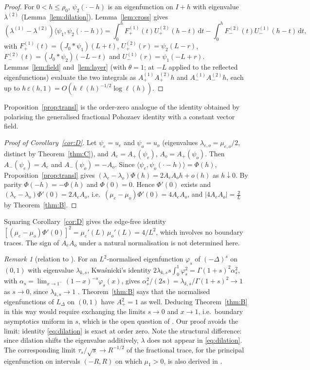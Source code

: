 \documentclass[11pt]{amsart}
\newcommand{\LD}{L_\Delta}
\newcommand{\eps}{\varepsilon}
\newcommand{\dd}{\,\mathrm{d}}
\theoremstyle{definition}
\theoremstyle{remark}
\newtheorem{remark}[theorem]{Remark}
\numberwithin{equation}{section}
\begin{document}
\begin{proof}
For $0<h\le\rho_0$, $\psi_2(\cdot-h)$ is an eigenfunction on $I+h$ with eigenvalue $\lambda^{(2)}$ (Lemma~\ref{lem:dilation}). Lemma~\ref{lem:cross} gives
\[
(\lambda^{(1)}-\lambda^{(2)})\langle\psi_1,\psi_2(\cdot-h)\rangle=\int_0^hF^{(1)}_+(t)U^{(2)}_+(h-t)\dd t-\int_0^hF^{(2)}_-(t)U^{(1)}_-(h-t)\dd t,
\]
with $F^{(1)}_+(t)=(J_0*\psi_1)(L+t)$, $U^{(2)}_+(r)=\psi_2(L-r)$, $F^{(2)}_-(t)=(J_0*\psi_2)(-L-t)$ and $U^{(1)}_-(r)=\psi_1(-L+r)$. Lemmas~\ref{lem:field} and~\ref{lem:layer} (with $\theta=1$; at $-L$ applied to the reflected eigenfunctions) evaluate the two integrals as $A_+^{(1)}A_+^{(2)}h$ and $A_-^{(1)}A_-^{(2)}h$, each up to $h\,\eps(h,1)=O(h\,\ell(h)^{-1/2}\log\ell(h))$.
\end{proof}

Proposition~\ref{prop:transl} is the order-zero analogue of the identity obtained by polarising the generalised fractional Pohozaev identity \cite[Thm.~1.2]{DFW24} with a constant vector field.

\begin{proof}[Proof of Corollary~\ref{cor:D}]
Let $\psi_e=u_e$ and $\psi_o=u_o$ (eigenvalues $\lambda_{e,o}=\mu_{e,o}/2$, distinct by Theorem~\ref{thm:C}), and $A_e=A_+(\psi_e)$, $A_o=A_+(\psi_o)$. Then $A_-(\psi_e)=A_e$ and $A_-(\psi_o)=-A_o$. Since $\langle\psi_e,\psi_o(\cdot-h)\rangle=\Phi(h)$, Proposition~\ref{prop:transl} gives $(\lambda_e-\lambda_o)\Phi(h)=2A_eA_oh+o(h)$ as $h\downarrow0$. By parity $\Phi(-h)=-\Phi(h)$ and $\Phi(0)=0$. Hence $\Phi'(0)$ exists and $(\lambda_e-\lambda_o)\Phi'(0)=2A_eA_o$, i.e.\ $(\mu_e-\mu_o)\Phi'(0)=4A_eA_o$, and $|4A_eA_o|=\frac2L$ by Theorem~\ref{thm:B}.
\end{proof}

Squaring Corollary~\ref{cor:D} gives the edge-free identity $[(\mu_e-\mu_o)\Phi'(0)]^2=\mu_e'(L)\,\mu_o'(L)=4/L^2$, which involves no boundary traces. The sign of $A_eA_o$ under a natural normalisation is not determined here.

\begin{remark}[relation to {\cite{Kw23}}]
For an $L^2$-normalised eigenfunction $\varphi_s$ of $(-\Delta)^s$ on $(0,1)$ with eigenvalue $\lambda_{k,s}$, Kwa\'snicki's identity $2\lambda_{k,s}s\int_0^1\varphi_s^2=\Gamma(1+s)^2\alpha_s^2$, with $\alpha_s=\lim_{x\to1^-}(1-x)^{-s}\varphi_s(x)$, gives $\alpha_s^2/(2s)=\lambda_{k,s}/\Gamma(1+s)^2\to1$ as $s\to0$, since $\lambda_{k,s}\to1$ \cite[Thm.~1.1]{FJW22}. Theorem~\ref{thm:B} says that the normalised eigenfunctions of $\LD$ on $(0,1)$ have $A_+^2=1$ as well. Deducing Theorem~\ref{thm:B} in this way would require exchanging the limits $s\to0$ and $x\to1$, i.e.\ boundary asymptotics uniform in $s$, which is the open question of \cite[Rem.~1.2(iii)]{FJW22}. Our proof avoids the limit: identity \eqref{eq:dilation} is exact at order zero. Note the structural difference: since dilation shifts the eigenvalue additively, $\lambda$ does not appear in \eqref{eq:dilation}. The corresponding limit $\tau_s/\sqrt s\to R^{-1/2}$ of the fractional trace, for the principal eigenfunction on intervals $(-R,R)$ on which $\mu_1>0$, is also derived in \cite[PL-297]{Mathia26}.
\end{remark}
\end{document}

